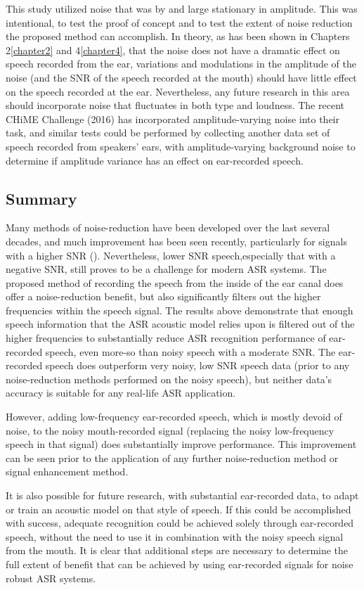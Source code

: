 \documentclass[dissertation,copyright]{uathesis}
\begin{document}
This study utilized noise that was by and large stationary in amplitude.  This was intentional, to test the proof of concept and to test the extent of noise reduction the proposed method can accomplish.  In theory, as has been shown in Chapters 2\ref{chapter2} and 4\ref{chapter4}, that the noise does not have a dramatic effect on speech recorded from the ear, variations and modulations in the amplitude of the noise (and the SNR of the speech recorded at the mouth) should have little effect on the speech recorded at the ear.  Nevertheless, any future research in this area should incorporate noise that fluctuates in both type and loudness.  The recent CHiME Challenge (2016) has incorporated amplitude-varying noise into their task, and similar tests could be performed by collecting another data set of speech recorded from speakers' ears, with amplitude-varying background noise to determine if amplitude variance has an effect on ear-recorded speech.

\subsection{Summary}

Many methods of noise-reduction have been developed over the last several decades, and much improvement has been seen recently, particularly for signals with a higher SNR (\cite{zhang:17}).  Nevertheless, lower SNR speech,especially that with a negative SNR, still proves to be a challenge for modern ASR systems.  The proposed method of recording the speech from the inside of the ear canal does offer a noise-reduction benefit, but also significantly filters out the higher frequencies within the speech signal.  The results above demonstrate that enough speech information that the ASR acoustic model relies upon is filtered out of the higher frequencies to substantially reduce ASR recognition performance of ear-recorded speech, even more-so than noisy speech with a moderate SNR.  The ear-recorded speech does outperform very noisy, low SNR speech data (prior to any noise-reduction methods performed on the noisy speech), but neither data's accuracy is suitable for any real-life ASR application.  

However, adding low-frequency ear-recorded speech, which is mostly devoid of noise, to the noisy mouth-recorded signal (replacing the noisy low-frequency speech in that signal) does substantially improve performance.  This improvement can be seen prior to the application of any further noise-reduction method or signal enhancement method.

It is also possible for future research, with substantial ear-recorded data, to adapt or train an acoustic model on that style of speech.  If this could be accomplished with success, adequate recognition could be achieved solely through ear-recorded speech, without the need to use it in combination with the noisy speech signal from the mouth.  It is clear that additional steps are necessary to determine the full extent of benefit that can be achieved by using ear-recorded signals for noise robust ASR systems.






\end{document}
